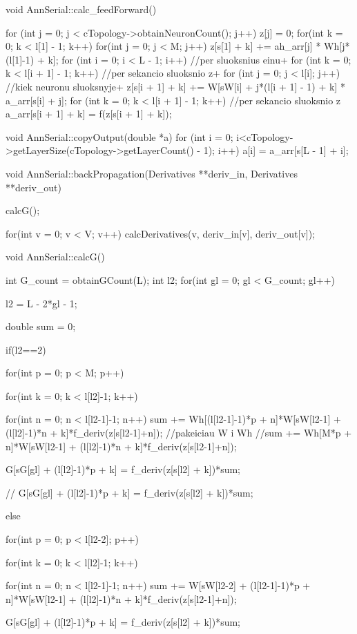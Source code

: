 void AnnSerial::calc_feedForward(){

  for (int j = 0; j < cTopology->obtainNeuronCount(); j++) {
		z[j] = 0;
	}
  for(int k = 0; k < l[1] - 1; k++){
    for(int j = 0; j < M; j++){
      z[s[1] + k] += ah_arr[j] * Wh[j*(l[1]-1) + k];
    }
  }
	for (int i = 0; i < L - 1; i++) {//per sluoksnius einu+
    for (int k = 0; k < l[i + 1] - 1; k++) {//per sekancio sluoksnio z+
		  for (int j = 0; j < l[i]; j++) { //kiek neuronu sluoksnyje+
				z[s[i + 1] + k] += W[sW[i] + j*(l[i + 1] - 1) + k] * a_arr[s[i] + j];
			}
		}
		for (int k = 0; k < l[i + 1] - 1; k++) {//per sekancio sluoksnio z
			a_arr[s[i + 1] + k] = f(z[s[i + 1] + k]);
		}
	}
}

void AnnSerial::copyOutput(double *a){
  for (int i = 0; i<cTopology->getLayerSize(cTopology->getLayerCount() - 1); i++)
		a[i] = a_arr[s[L - 1] + i];
}

void AnnSerial::backPropagation(Derivatives **deriv_in, Derivatives **deriv_out){

  calcG();

  for(int v = 0; v < V; v++)
    calcDerivatives(v, deriv_in[v],  deriv_out[v]);
}

void AnnSerial::calcG(){
  int G_count = obtainGCount(L);
  int l2;
  for(int gl = 0; gl < G_count; gl++){
    l2 = L - 2*gl - 1;

    double sum = 0;

    if(l2==2){

      for(int p = 0; p < M; p++){
        for(int k = 0; k < l[l2]-1; k++){

          for(int n = 0; n < l[l2-1]-1; n++){
            sum += Wh[(l[l2-1]-1)*p + n]*W[sW[l2-1] + (l[l2]-1)*n + k]*f_deriv(z[s[l2-1]+n]);
            //pakeiciau W i Wh
            //sum += Wh[M*p + n]*W[sW[l2-1] + (l[l2]-1)*n + k]*f_deriv(z[s[l2-1]+n]);
          }

          G[sG[gl] + (l[l2]-1)*p + k] = f_deriv(z[s[l2] + k])*sum;
        }

      //  G[sG[gl] + (l[l2]-1)*p + k] = f_deriv(z[s[l2] + k])*sum;
      }

    }else{
      for(int p = 0; p < l[l2-2]; p++){
        for(int k = 0; k < l[l2]-1; k++){

          for(int n = 0; n < l[l2-1]-1; n++){
            sum += W[sW[l2-2] + (l[l2-1]-1)*p + n]*W[sW[l2-1] + (l[l2]-1)*n + k]*f_deriv(z[s[l2-1]+n]);
          }

          G[sG[gl] + (l[l2]-1)*p + k] = f_deriv(z[s[l2] + k])*sum;
        }
      }
    }
  }
}

